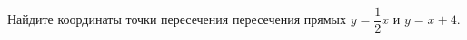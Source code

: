 \begin{ex}
	\begin{condition}
		Найдите координаты точки пересечения пересечения прямых \( y=\dfrac{1}{2}x \) и \( y=x+4 \).
	\end{condition}
\end{ex}